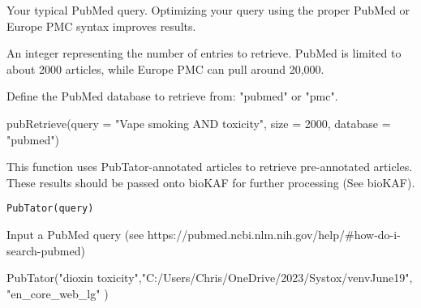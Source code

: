 \documentclass[a4paper]{book}
\begin{document}
%
\begin{Arguments}
\begin{ldescription}
\item[\code{query}] Your typical PubMed query. Optimizing your query using the proper PubMed or Europe PMC syntax improves results.

\item[\code{size}] An integer representing the number of entries to retrieve. PubMed is limited to about 2000 articles, while Europe PMC can pull around 20,000.

\item[\code{database}] Define the PubMed database to retrieve from: "pubmed" or "pmc".
\end{ldescription}
\end{Arguments}
%
\begin{Examples}
\begin{ExampleCode}
pubRetrieve(query = "Vape smoking AND toxicity", size = 2000, database = "pubmed")
\end{ExampleCode}
\end{Examples}
%
\begin{Description}\relax
This function uses PubTator-annotated articles to retrieve pre-annotated articles. These results should be passed onto bioKAF for further processing (See bioKAF).
\end{Description}
%
\begin{Usage}
\begin{verbatim}
PubTator(query)
\end{verbatim}
\end{Usage}
%
\begin{Arguments}
\begin{ldescription}
\item[\code{query}] Input a PubMed query (see https://pubmed.ncbi.nlm.nih.gov/help/\#how-do-i-search-pubmed)
\end{ldescription}
\end{Arguments}
%
\begin{Examples}
\begin{ExampleCode}
PubTator("dioxin toxicity","C:/Users/Chris/OneDrive/2023/Systox/venvJune19", "en_core_web_lg" )
\end{ExampleCode}
\end{Examples}
\end{document}
